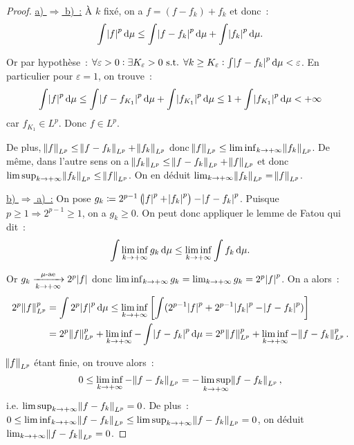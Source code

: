 \documentclass{article}
\theoremstyle{definition}
\newcommand{\pinfty}{{+\infty}}
\newcommand{\st}{\text{ s.t. }}
\begin{document}
\begin{proof} \underline {a) $\Rightarrow$ b)~:} À $k$ fixé, on a $f = (f-f_k) + f_k$ et donc~:
\[\int \abs f^p\dif\mu \leq \int\abs {f-f_k}^p\dif\mu + \int \abs {f_k}^p\dif\mu.\]

Or par hypothèse~: $\forall \varepsilon > 0 : \exists K_\varepsilon > 0 \st \forall k \geq K_\varepsilon : \int \abs {f-f_k}^p\dif\mu < \varepsilon$. En particulier
pour $\varepsilon = 1$, on trouve~:
\[\int \abs f^p\dif\mu \leq \int \abs {f-f_{K_1}}^p\dif\mu + \int\abs {f_{K_1}}^p\dif\mu \leq 1 + \int \abs{f_{K_1}}^p\dif\mu < \pinfty\]
car $f_{K_1} \in L^p$. Donc $f \in L^p$.

De plus, $\norm f_{L^p} \leq \norm {f-f_k}_{L^p} + \norm {f_k}_{L^p}$ donc $\norm f_{L^p} \leq \liminf_{k \to \pinfty}\norm {f_k}_{L^p}$. De même, dans l'autre sens on a
$\norm {f_k}_{L^p} \leq \norm {f-f_k}_{L^p} + \norm f_{L^p}$ et donc $\limsup_{k \to \pinfty}\norm {f_k}_{L^p} \leq \norm f_{L^p}$. On en déduit
$\lim_{k \to \pinfty}\norm {f_k}_{L^p} = \norm f_{L^p}$.

\underline {b) $\Rightarrow$ a)~:} On pose $g_k \coloneqq 2^{p-1}\left(\abs f^p + \abs {f_k}^p\right) - \abs {f-f_k}^p$.
Puisque $p \geq 1 \Rightarrow 2^{p-1} \geq 1$, on a $g_k \geq 0$. On peut donc appliquer le lemme de Fatou qui dit~:
\[\int\liminf_{k \to \pinfty}g_k\dif\mu \leq \liminf_{k \to \pinfty}\int f_k\dif\mu.\]

Or $g_k \xrightarrow[k \to \pinfty]{\mu\text{-ae}} 2^p\abs f$ donc $\liminf_{k \to \pinfty}g_k = \lim_{k \to \pinfty}g_k = 2^p\abs f^p$. On a alors~:
\begin{align*}
	2^p\norm f_{L^p}^p &= \int 2^p\abs f^p\dif\mu \leq \liminf_{k \to \pinfty}\left[\int (2^{p-1}\abs f^p + 2^{p-1}\abs {f_k}^p - \abs {f-f_k}^p)\right] \\
  	&= 2^p\norm f_{L^p}^p + \liminf_{k \to \pinfty}-\int\abs {f-f_k}^p\dif\mu = 2^p\norm f_{L^p}^p + \liminf_{k \to \pinfty}-\norm {f-f_k}_{L^p}^p.
\end{align*}

$\norm f_{L^p}$ étant finie, on trouve alors~:
\[0 \leq \liminf_{k \to \pinfty}-\norm {f-f_k}_{L^p} = -\limsup_{k \to \pinfty}\norm {f-f_k}_{L^p},\]
i.e. $\limsup_{k \to \pinfty}\norm {f-f_k}_{L^p} = 0$. De plus~: $0 \leq \liminf_{k \to \pinfty}\norm {f-f_k}_{L^p} \leq \limsup_{k \to \pinfty}\norm {f-f_k}_{L^p} = 0$,
on déduit $\lim_{k \to \pinfty}\norm {f-f_k}_{L^p} = 0$.
\end{proof}
\end{document}
